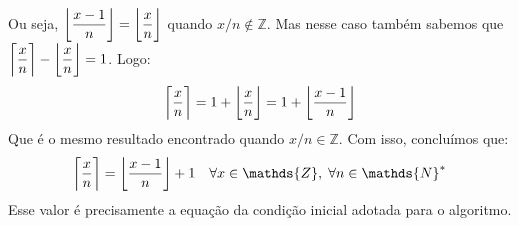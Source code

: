 Ou seja,
$\left\lfloor \dfrac{x - 1}{n} \right\rfloor =
 \left\lfloor \dfrac{x\vphantom{l}}{n} \right\rfloor$
quando $x/n \notin \mathds{Z}$.
Mas nesse caso também sabemos que
$\left\lceil \dfrac{x\vphantom{l}}{n} \right\rceil -
 \left\lfloor \dfrac{x\vphantom{l}}{n} \right\rfloor = 1$.
Logo:
\[
  \left\lceil \dfrac{x\vphantom{l}}{n} \right\rceil
  = 1 + \left\lfloor \dfrac{x\vphantom{l}}{n} \right\rfloor
  = 1 + \left\lfloor \dfrac{x - 1}{n} \right\rfloor
\]
Que é o mesmo resultado encontrado quando $x/n \in \mathds{Z}$.
Com isso, concluímos que:
\[
  \left\lceil \dfrac{x\vphantom{l}}{n} \right\rceil
  = \left\lfloor \dfrac{x - 1}{n} \right\rfloor + 1
  \quad \forall x \in \mathds{Z}, \; \forall n \in \mathds{N}^*
\]
Esse valor é precisamente a equação da condição inicial
adotada para o algoritmo.
